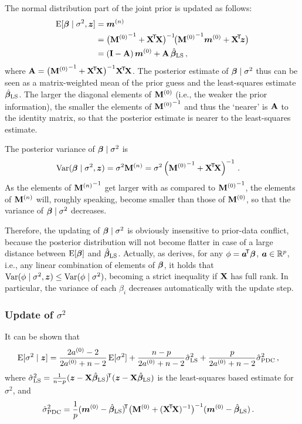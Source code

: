 The normal distribution part of the joint prior is updated as follows:%
\begin{align*}
\operatorname{E}[\boldsymbol{\beta}\mid\sigma^2, {\bm z}] &= {\bm m}^{(n)} \\
                           &= \big( {\mathbf{M}^{(0)}}^{-1} + \mathbf{X}^{{\mbox{\!\scriptsize\textsf{T}}}} \! \mathbf{X} \big)^{-1} \!\big( {\mathbf{M}^{(0)}}^{-1} {\bm m}^{(0)} + \mathbf{X}^{{\mbox{\!\scriptsize\textsf{T}}}} \! {\bm z} \big) \\
                           &= (\mathbf{I} - \mathbf{A})\, {\bm m}^{(0)} + \mathbf{A}\, \hat{\boldsymbol{\beta}}_\text{LS}\,,
\end{align*}
where $\mathbf{A} = \big({\mathbf{M}^{(0)}}^{-1} + \mathbf{X}^{{\mbox{\!\scriptsize\textsf{T}}}} \! \mathbf{X}\big)^{-1} \mathbf{X}^{{\mbox{\!\scriptsize\textsf{T}}}} \! \mathbf{X}$. The posterior estimate of $\boldsymbol{\beta}\mid\sigma^2$
thus can be seen as a matrix-weighted mean of the prior guess and the least-squares estimate $\hat{\boldsymbol{\beta}}_\text{LS}$.
The larger the diagonal elements of $\mathbf{M}^{(0)}$ (i.e., the weaker the prior information),
the smaller the elements of ${\mathbf{M}^{(0)}}^{-1}$ and thus the `nearer' is $\mathbf{A}$ to the identity matrix,
so that the posterior estimate is nearer to the least-squares estimate.

The posterior variance of $\boldsymbol{\beta}\mid\sigma^2$ is %
\begin{align*}
\operatorname{Var}(\boldsymbol{\beta}\mid\sigma^2, {\bm z}) &= \sigma^2 \mathbf{M}^{(n)} = \sigma^2 \left( {\mathbf{M}^{(0)}}^{-1} + \mathbf{X}^{{\mbox{\!\scriptsize\textsf{T}}}} \! \mathbf{X} \right)^{-1}\,.
\end{align*}
As the elements of ${\mathbf{M}^{(n)}}^{-1}$ get larger with as compared to ${\mathbf{M}^{(0)}}^{-1}$,
the elements of $\mathbf{M}^{(n)}$ will, roughly speaking, become smaller than those of $\mathbf{M}^{(0)}$,
so that the variance of $\boldsymbol{\beta}\mid\sigma^2$ decreases.

Therefore, the updating of $\boldsymbol{\beta}\mid\sigma^2$ is obviously insensitive to prior-data conflict,
because the posterior distribution will not become flatter in case of a large
distance between $\operatorname{E}[\boldsymbol{\beta}]$ and $\hat{\boldsymbol{\beta}}_\text{LS}$. %
Actually, as \textcite{1994:ohagan} derives,
for any $\phi = {\bm a}^{{\mbox{\!\scriptsize\textsf{T}}}} \boldsymbol{\beta}$, ${\bm a} \in \mathbb{R}^p$, i.e., any linear combination of elements of $\boldsymbol{\beta}$, it holds that
$\operatorname{Var}(\phi\mid\sigma^2,{\bm z}) \leq \operatorname{Var}(\phi\mid\sigma^2)$, becoming a strict inequality if
$\mathbf{X}$ has full rank. In particular, the variance of each $\beta_i$ decreases
automatically with the update step.


\subsubsection{Update of \texorpdfstring{$\sigma^2$}{sigma2}}
\label{sec:scp-update2}

It can be shown \parencite{1994:ohagan} that
\begin{align}
\E[\sigma^2\mid \z] &= \frac{2\az - 2}{2\az + n - 2} \E[\sigma^2]
                     + \frac{n - p}   {2\az + n - 2} \sls
                     + \frac{p}       {2\az + n - 2} \spdc\,,
\label{equ:scp-decomposition}
\end{align}
where $\hat{\sigma}^2_\text{LS} = \frac{1}{n-p} ({\bm z} - \mathbf{X}\hat{\boldsymbol{\beta}}_\text{LS})^{{\mbox{\!\scriptsize\textsf{T}}}} ({\bm z} - \mathbf{X}\hat{\boldsymbol{\beta}}_\text{LS})$ is
the least-squares based estimate for $\sigma^2$, and
\begin{align*}
\hat{\sigma}^2_\text{PDC} &= \frac{1}{p} ({\bm m}^{(0)} - \hat{\boldsymbol{\beta}}_\text{LS})^{{\mbox{\!\scriptsize\textsf{T}}}} \big(\mathbf{M}^{(0)} + (\mathbf{X}^{{\mbox{\!\scriptsize\textsf{T}}}} \! \mathbf{X})^{-1} \big)^{-1} ({\bm m}^{(0)} - \hat{\boldsymbol{\beta}}_\text{LS})\,.
\end{align*}

